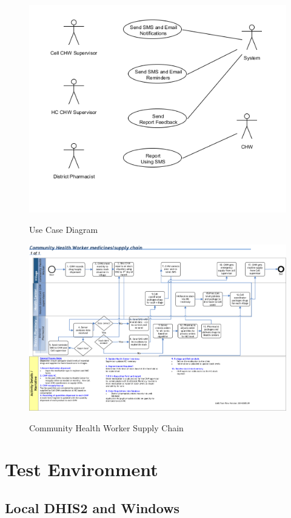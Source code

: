 \documentclass[a4paper, 11pt]{report}
\begin{document}
\begin{figure}
\includegraphics[width=\columnwidth]{img/hmisReq.png}
\label{fig:use_case}
\caption{Use Case Diagram}
\end{figure}

\begin{figure}
\includegraphics[width=\columnwidth]{img/supplyChain.png}
\label{fig:supplychainsolution}
\caption{Community Health Worker Supply Chain}
\end{figure}


\chapter{Test Environment}
\section{Local DHIS2 and Windows}
\end{document}
